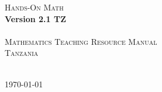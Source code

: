 \begin{titlepage}
\begin{center}
	\textsc{{\Huge Hands-On Math}}\\[0.4cm]
	\textbf{{\huge Version 2.1 TZ}}\\[1.5cm]
	\HRule\\[0.4cm]
	\textsc{{\Large Mathematics Teaching Resource Manual}}\\[0.4cm]
	\textsc{{\Large Tanzania}}\\[0.4cm]
	\HRule\\[0.5cm]
\end{center}

\vfill
\begin{center}
	{\large \today}
\end{center}
\end{titlepage}
